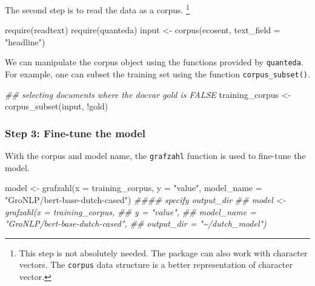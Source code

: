 \documentclass[
]{ccr}
\newenvironment{Shaded}{\begin{snugshade}}{\end{snugshade}}
\newcommand{\AttributeTok}[1]{\textcolor[rgb]{0.40,0.45,0.13}{#1}}
\newcommand{\DocumentationTok}[1]{\textcolor[rgb]{0.37,0.37,0.37}{\textit{#1}}}
\newcommand{\FunctionTok}[1]{\textcolor[rgb]{0.28,0.35,0.67}{#1}}
\newcommand{\NormalTok}[1]{\textcolor[rgb]{0.00,0.23,0.31}{#1}}
\newcommand{\OtherTok}[1]{\textcolor[rgb]{0.00,0.23,0.31}{#1}}
\newcommand{\SpecialCharTok}[1]{\textcolor[rgb]{0.37,0.37,0.37}{#1}}
\newcommand{\StringTok}[1]{\textcolor[rgb]{0.13,0.47,0.30}{#1}}
\begin{document}
The second step is to read the data as a corpus. \footnote{This step is
  not absolutely needed. The package can also work with character
  vectors. The \texttt{corpus} data structure is a better representation
  of character vector.}

\begin{Shaded}
\begin{Highlighting}[]
\FunctionTok{require}\NormalTok{(readtext)}
\FunctionTok{require}\NormalTok{(quanteda)}
\NormalTok{input }\OtherTok{\textless{}{-}} \FunctionTok{corpus}\NormalTok{(ecosent, }\AttributeTok{text\_field =} \StringTok{"headline"}\NormalTok{)}
\end{Highlighting}
\end{Shaded}

We can manipulate the corpus object using the functions provided by
\texttt{quanteda}. For example, one can subset the training set using
the function \texttt{corpus\_subset()}.

\begin{Shaded}
\begin{Highlighting}[]
\DocumentationTok{\#\# selecting documents where the docvar \textasciigrave{}gold\textasciigrave{} is FALSE}
\NormalTok{training\_corpus }\OtherTok{\textless{}{-}} \FunctionTok{corpus\_subset}\NormalTok{(input, }\SpecialCharTok{!}\NormalTok{gold)}
\end{Highlighting}
\end{Shaded}

\hypertarget{step-3-fine-tune-the-model}{%
\subsubsection{Step 3: Fine-tune the
model}\label{step-3-fine-tune-the-model}}

With the corpus and model name, the \texttt{grafzahl} function is used
to fine-tune the model.

\begin{Shaded}
\begin{Highlighting}[]
\NormalTok{model }\OtherTok{\textless{}{-}} \FunctionTok{grafzahl}\NormalTok{(}\AttributeTok{x =}\NormalTok{ training\_corpus,}
                  \AttributeTok{y =} \StringTok{"value"}\NormalTok{,}
                  \AttributeTok{model\_name =} \StringTok{"GroNLP/bert{-}base{-}dutch{-}cased"}\NormalTok{)}
\DocumentationTok{\#\#\#\# specify \textasciigrave{}output\_dir\textasciigrave{}}
\DocumentationTok{\#\# model \textless{}{-} grafzahl(x = training\_corpus,}
\DocumentationTok{\#\#                   y = "value",}
\DocumentationTok{\#\#                   model\_name = "GroNLP/bert{-}base{-}dutch{-}cased",}
\DocumentationTok{\#\#                   output\_dir = "\textasciitilde{}/dutch\_model")}
\end{Highlighting}
\end{Shaded}
\end{document}
